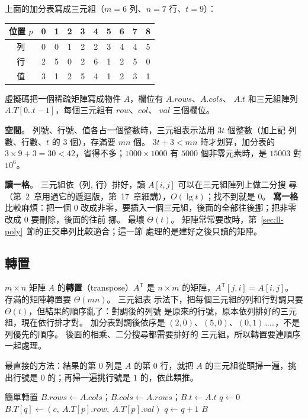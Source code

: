 上面的加分表寫成三元組（$m = 6$ 列、$n = 7$ 行、$t = 9$）：

\begin{center}
\begin{tabular}{c|ccccccccc}
\toprule
位置 $p$ & 0 & 1 & 2 & 3 & 4 & 5 & 6 & 7 & 8 \\
\midrule
列 & 0 & 0 & 1 & 2 & 2 & 3 & 4 & 4 & 5 \\
行 & 2 & 5 & 0 & 2 & 6 & 1 & 2 & 5 & 0 \\
值 & 3 & 1 & 2 & 5 & 4 & 1 & 2 & 3 & 1 \\
\bottomrule
\end{tabular}
\end{center}

虛擬碼把一個稀疏矩陣寫成物件 $A$，欄位有 $A.\mathit{rows}$、$A.\mathit{cols}$、
$A.t$ 和三元組陣列 $A.T[0..t-1]$，每個三元組有 $\mathit{row}$、$\mathit{col}$、
$\mathit{val}$ 三個欄位。

\textbf{空間}。 列號、行號、值各占一個整數時，三元組表示法用 $3t$ 個整數（加上記
列數、行數、$t$ 的 $3$ 個），存滿要 $mn$ 個。 $3t + 3 < mn$ 時才划算，加分表的
$3 \times 9 + 3 = 30 < 42$，省得不多；$1000 \times 1000$ 有 $5000$ 個非零元素時，是
$15003$ 對 $10^6$。

\textbf{讀一格}。 三元組依（列, 行）排好，讀 $A[i, j]$ 可以在三元組陣列上做二分搜
尋（第~2~章用過它的遞迴版，第~17~章細講），$O(\lg t)$；找不到就是 $0$。 \textbf{寫一格}比較麻煩：把一個 $0$
改成非零，要插入一個三元組，後面的全部往後挪；把非零改成 $0$ 要刪除，後面的往前
挪。 最壞 $\Theta(t)$。 矩陣常常要改時，第~\ref{sec:ll-poly}~節的正交串列比較適合；這一節
處理的是建好之後只讀的矩陣。

\subsection{轉置}

$m \times n$ 矩陣 $A$ 的\textbf{轉置}（transpose）$A^{\mathsf T}$ 是 $n \times m$
的矩陣，$A^{\mathsf T}[j, i] = A[i, j]$。 存滿的矩陣轉置要 $\Theta(mn)$。 三元組表
示法下，把每個三元組的列和行對調只要 $\Theta(t)$，但結果的順序亂了：對調後的列號
是原來的行號，原本依列排好的三元組，現在依行排才對。 加分表對調後依序是
$(2,0)$、$(5,0)$、$(0,1)$……，不是列優先的順序。 後面的相乘、二分搜尋都需要排好的
三元組，所以轉置要連順序一起處理。

最直接的方法：結果的第 $0$ 列是 $A$ 的第 $0$ 行，就把 $A$ 的三元組從頭掃一遍，挑
出行號是 $0$ 的；再掃一遍挑行號是 $1$ 的，依此類推。

\begin{pseudo}[label=alg:arr-simple-transpose]{簡單轉置}
    \State $B.\mathit{rows} \gets A.\mathit{cols}$；$B.\mathit{cols} \gets A.\mathit{rows}$；$B.t \gets A.t$
    \State $q \gets 0$
                \State $B.T[q] \gets (c,\ A.T[p].\mathit{row},\ A.T[p].\mathit{val})$
                \State $q \gets q + 1$
            \EndIf
        \EndFor
    \EndFor
    \State \Return $B$
\EndFunction
\end{pseudo}

